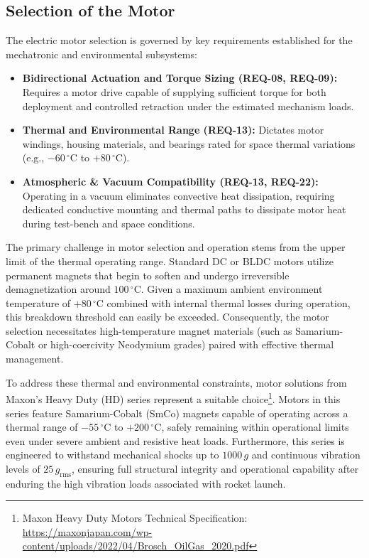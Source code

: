 \subsection{Selection of the Motor}
\label{subsec:selection-of-the-motor}

The electric motor selection is governed by key requirements established for the mechatronic and environmental subsystems:

\begin{itemize}
    \item \textbf{Bidirectional Actuation and Torque Sizing (REQ-08, REQ-09):} Requires a motor drive capable of supplying sufficient torque for both deployment and controlled retraction under the estimated mechanism loads.
    \item \textbf{Thermal and Environmental Range (REQ-13):} Dictates motor windings, housing materials, and bearings rated for space thermal variations (e.g., $-60\,^\circ\text{C}$ to $+80\,^\circ\text{C}$).
    \item \textbf{Atmospheric \& Vacuum Compatibility (REQ-13, REQ-22):} Operating in a vacuum eliminates convective heat dissipation, requiring dedicated conductive mounting and thermal paths to dissipate motor heat during test-bench and space conditions.
\end{itemize}

The primary challenge in motor selection and operation stems from the upper limit of the thermal operating range. Standard DC or BLDC motors utilize permanent magnets that begin to soften and undergo irreversible demagnetization around $100\,^\circ\text{C}$. Given a maximum ambient environment temperature of $+80\,^\circ\text{C}$ combined with internal thermal losses during operation, this breakdown threshold can easily be exceeded. Consequently, the motor selection necessitates high-temperature magnet materials (such as Samarium-Cobalt or high-coercivity Neodymium grades) paired with effective thermal management.

To address these thermal and environmental constraints, motor solutions from Maxon's Heavy Duty (HD) series represent a suitable choice\footnote{Maxon Heavy Duty Motors Technical Specification: \url{https://maxonjapan.com/wp-content/uploads/2022/04/Brosch_OilGas_2020.pdf}}. Motors in this series feature Samarium-Cobalt (SmCo) magnets capable of operating across a thermal range of $-55\,^\circ\text{C}$ to $+200\,^\circ\text{C}$, safely remaining within operational limits even under severe ambient and resistive heat loads. Furthermore, this series is engineered to withstand mechanical shocks up to $1000\,g$ and continuous vibration levels of $25\,g_{\text{rms}}$, ensuring full structural integrity and operational capability after enduring the high vibration loads associated with rocket launch.

